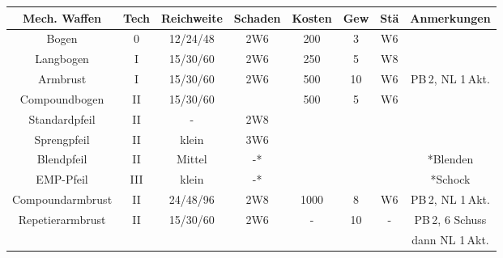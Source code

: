 \documentclass[10pt,a4paper]{report}
\begin{document}
\begin{table}
\begin{tabular}{|c|c|c|c|c|c|c|c|}
\hline 
\textbf{Mech. Waffen} & Tech & Reichweite & Schaden &  Kosten & Gew & Stä & Anmerkungen \\ 
\hline 
Bogen & 0 & 12/24/48 & 2W6 & 200 & 3 & W6 &  \\ 
\hline 
Langbogen & I & 15/30/60 & 2W6 & 250 & 5 & W8 &  \\ 
\hline 
Armbrust & I & 15/30/60 & 2W6 & 500 & 10 & W6 & PB\,2, NL 1\,Akt. \\ 
\hline 
Compoundbogen & II & 15/30/60 & & 500 & 5 & W6 & \\ 
Standardpfeil & II & - & 2W8 & & & & \\
Sprengpfeil & II & klein & 3W6 & & & & \\
Blendpfeil & II & Mittel & -* & & & & *Blenden \\
EMP-Pfeil & III & klein & -* & & & & *Schock \\
\hline 
Compoundarmbrust & II & 24/48/96 & 2W8 & 1000 & 8 & W6 & PB\,2, NL 1\,Akt. \\ 
\hline
Repetierarmbrust & II & 15/30/60 & 2W6 & - & 10 & - & PB\,2, 6 Schuss \\ 
 & & & & & & & dann NL 1\,Akt. \\
\hline
\end{tabular}
\end{table}
\end{document}

